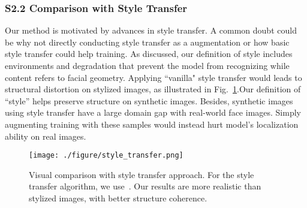 \documentclass[10pt,twocolumn,letterpaper]{article}
\begin{document}
\subsubsection*{S2.2 Comparison with Style Transfer}


Our method is motivated by advances in style transfer. A common doubt could be why not directly conducting style transfer as a augmentation or how basic style transfer could help training. As discussed, our definition of style includes environments and degradation that prevent the model from recognizing while content refers to facial geometry. Applying ``vanilla" style transfer would leads to structural distortion on stylized images, as illustrated in Fig.~\ref{fig:style_trans}.Our definition of ``style'' helps preserve structure on synthetic images. Besides, synthetic images using style transfer have a large domain gap with real-world face images. Simply augmenting training with these samples would instead hurt model's localization ability on real images.

\begin{figure}[htb]
	\begin{center}
		\texttt{[image: ./figure/style\_transfer.png]}
	\end{center}
	\vspace{-0.5cm}
	\caption{\small{Visual comparison with style transfer approach. For the style transfer algorithm, we use~\cite{gatys2016image}. Our results are more realistic than stylized images, with better structure coherence.}}
	\vspace{-0.2cm}
	\label{fig:style_trans}
\end{figure}
\end{document}
